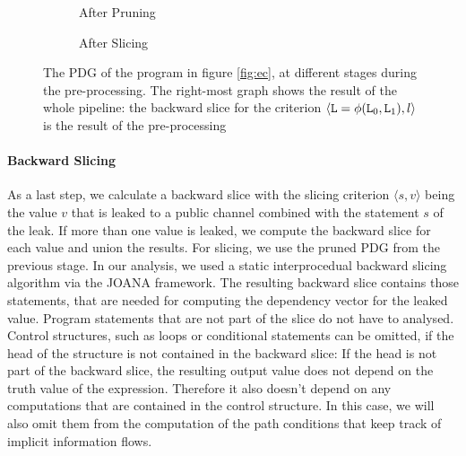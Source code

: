 \begin{figure}
\begin{subfigure}{.32\textwidth}
    \caption{After Pruning}
    \end{subfigure}
       \begin{subfigure}{.33\textwidth}
    \caption{After Slicing}
    \end{subfigure}
    
    
    \caption{The PDG of the program in figure \ref{fig:ec}, at different stages during the pre-processing. The right-most graph shows the result of the whole pipeline: the backward slice for the criterion $\langle \mathtt{L} = \phi(\mathtt{L}_0, \mathtt{L}_1), l \rangle$ is the result of the pre-processing}
    \label{fig:prune}
\end{figure}

\paragraph{Backward Slicing}
As a last step, we calculate a backward slice with the slicing criterion $\langle s, v \rangle$ being the value $v$ that is leaked to a public channel combined with the statement $s$ of the leak. If more than one value is leaked, we compute the backward slice for each value and union the results.  For slicing, we use the pruned PDG from the previous stage. In our analysis, we used a static interprocedual backward slicing algorithm via the JOANA framework. 
The resulting backward slice contains those statements, that are needed for computing the dependency vector for the leaked value. Program statements that are not part of the slice do not have to analysed. Control structures, such as loops or conditional statements can be omitted, if the head of the structure is not contained in the backward slice: If the head is not part of the backward slice, the resulting output value does not depend on the truth value of the expression. Therefore it also doesn't depend on any computations that are contained in the control structure. In this case, we will also omit them from the computation of the path conditions that keep track of implicit information flows.

